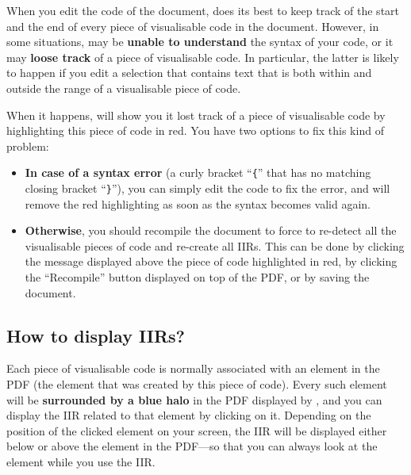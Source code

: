 \begin{warning}
    When you edit the code of the document, \iLaTeX{} does its best to keep track of the start and the end of every piece of visualisable code in the document.
    However, in some situations, \iLaTeX{} may be \textbf{unable to understand} the syntax of your code, or it may \textbf{loose track} of a piece of visualisable code.
    In particular, the latter is likely to happen if you edit a selection that contains text that is both within and outside the range of a visualisable piece of code.
    
    When it happens, \iLaTeX{} will show you it lost track of a piece of visualisable code by highlighting this piece of code in red.
    You have two options to fix this kind of problem:
    
    \begin{itemize}
        \item \textbf{In case of a syntax error} (\eg a curly bracket ``\verb|{|'' that has no matching closing bracket ``\verb|}|''), you can simply edit the code to fix the error, and \iLaTeX{} will remove the red highlighting as soon as the syntax becomes valid again.
        
        \item \textbf{Otherwise}, you should recompile the document to force \iLaTeX{} to re-detect all the visualisable pieces of code and re-create all IIRs.
        This can be done by clicking the message displayed above the piece of code highlighted in red, by clicking the ``Recompile'' button displayed on top of the PDF, or by saving the document.
    \end{itemize}
\end{warning}


\subsection{How to display IIRs?}

Each piece of visualisable code is normally associated with an element in the PDF (the element that was created by this piece of code).
Every such element will be \textbf{surrounded by a blue halo} in the PDF displayed by \iLaTeX{}, and you can display the IIR related to that element by clicking on it.
Depending on the position of the clicked element on your screen, the IIR will be displayed either below or above the element in the PDF---so that you can always look at the element while you use the IIR.

